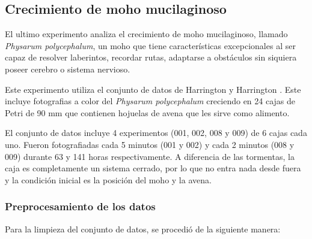 \subsection{Crecimiento de moho mucilaginoso}

El ultimo experimento analiza el crecimiento de moho mucilaginoso, llamado \textit{Physarum polycephalum}, un moho que tiene características excepcionales al ser capaz de resolver laberintos, recordar rutas, adaptarse a obstáculos sin siquiera poseer cerebro o sistema nervioso. 

Este experimento utiliza el conjunto de datos de Harrington y Harrington \cite{harrington2026physarum}. Este incluye fotografias a color del \textit{Physarum polycephalum} creciendo en 24 cajas de Petri de 90 mm que contienen hojuelas de avena que les sirve como alimento.  

El conjunto de datos incluye 4 experimentos (001, 002, 008 y 009) de 6 cajas cada uno. Fueron fotografiadas cada 5 minutos (001 y 002) y cada 2 minutos (008 y 009) durante 63 y 141 horas respectivamente. A diferencia de las tormentas, la caja es completamente un sistema cerrado, por lo que no entra nada desde fuera y la condición inicial es la posición del moho y la avena.


\subsubsection{Preprocesamiento de los datos}

Para la limpieza del conjunto de datos, se procedió de la siguiente manera:

